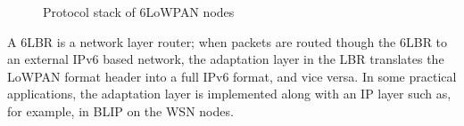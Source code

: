 \begin{figure}[htbp]
  \begin{center}
    \leavevmode
    \caption{Protocol stack of 6LoWPAN nodes}
    \label{fig:protocol stack}
  \end{center}
\end{figure}

A 6LBR is a network layer router; when packets are routed though the 6LBR to an external IPv6 based network, the adaptation layer in the LBR translates the LoWPAN format header into a full IPv6 format, and
vice versa. In some practical applications, the adaptation layer is implemented along with an IP
layer such as, for example, in BLIP on the WSN nodes.
\newline


